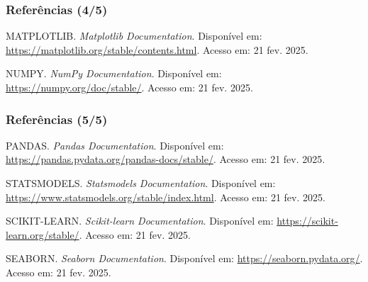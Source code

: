 \begin{frame}
	\frametitle{Referências (4/5)}
	
	\begin{thebibliography}{99}
		
		MATPLOTLIB. \textit{Matplotlib Documentation}. Disponível em: \url{https://matplotlib.org/stable/contents.html}. Acesso em: 21 fev. 2025.
		
		NUMPY. \textit{NumPy Documentation}. Disponível em: \url{https://numpy.org/doc/stable/}. Acesso em: 21 fev. 2025.
		
	\end{thebibliography}
\end{frame}

\begin{frame}
	\frametitle{Referências (5/5)}
	
	\begin{thebibliography}{99}
		
		PANDAS. \textit{Pandas Documentation}. Disponível em: \url{https://pandas.pydata.org/pandas-docs/stable/}. Acesso em: 21 fev. 2025.
		
		STATSMODELS. \textit{Statsmodels Documentation}. Disponível em: \url{https://www.statsmodels.org/stable/index.html}. Acesso em: 21 fev. 2025.
		
		SCIKIT-LEARN. \textit{Scikit-learn Documentation}. Disponível em: \url{https://scikit-learn.org/stable/}. Acesso em: 21 fev. 2025.
		
		SEABORN. \textit{Seaborn Documentation}. Disponível em: \url{https://seaborn.pydata.org/}. Acesso em: 21 fev. 2025.
		
	\end{thebibliography}
\end{frame}